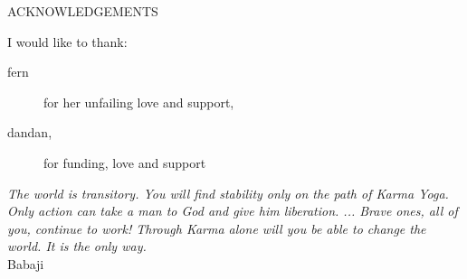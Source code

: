 \newpage
{}

\begin{center}
ACKNOWLEDGEMENTS
\end{center}

\noindent I would like to thank:
\begin{description}
\item[fern]
	for her unfailing love and support,
\item[dandan,]
	for funding, love and support
\end{description}

\begin{flushright}
\textit{The world is transitory. You will find stability only on the path of
Karma Yoga. Only action can take a man to God and give him
liberation. ...  Brave ones, all of you, continue to work!  Through
Karma alone will you be able to change the world. It is the only
way.}
\\
Babaji \\
\end{flushright}
